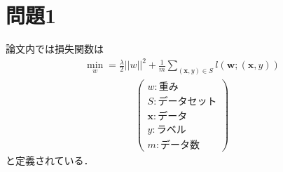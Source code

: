 \section*{問題1}
論文内では損失関数は
\begin{eqnarray*}
    \min_{w}=\frac{\lambda}{2}||w||^2+\frac{1}{m}\sum_{(\bm{x}, y)\in S}l(\bm{w};(\bm{x}, y))
\end{eqnarray*}
\begin{eqnarray*}
    \left(\begin{array}{l}w:重み\\S:データセット\\\bm{x}:データ\\y:ラベル\\m:データ数\end{array}\right)
\end{eqnarray*}
と定義されている．